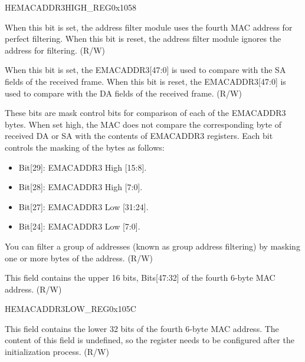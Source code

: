 \begin{register}{H}{EMACADDR3HIGH\_REG}{0x1058}\label{regdesc:EMACADDR3HIGHREG}
%
%
%
%
%
\regnewline%
\begin{regdesc}\begin{reglist}
\item [ADDRESS\_ENABLE3]When this bit is set, the address filter module uses the fourth MAC address  for perfect filtering. When this bit is reset, the address filter module ignores the address for filtering. (R/W)
\item [SOURCE\_ADDRESS3]When this bit is set, the EMACADDR3[47:0] is used to compare with the SA fields of the received frame. When this bit is reset, the EMACADDR3[47:0] is used to compare with the DA fields of the received frame. (R/W)
\item [MASK\_BYTE\_CONTROL3]These bits are mask control bits for comparison of each of the EMACADDR3 bytes. When set high, the MAC does not compare the corresponding byte of received DA or SA with the contents of EMACADDR3 registers. Each bit controls the masking of the bytes as follows: \begin{itemize}
\item Bit[29]: EMACADDR3 High [15:8]. \item Bit[28]: EMACADDR3 High [7:0]. \item Bit[27]: EMACADDR3 Low [31:24]. \item Bit[24]: EMACADDR3 Low [7:0].
\end{itemize} You can filter a group of addresses (known as group address filtering) by masking one or more bytes of the address. (R/W)
\item [MAC\_ADDRESS3\_HI]This field contains the upper 16 bits, Bits[47:32] of the fourth 6-byte MAC address. (R/W)
\end{reglist}\end{regdesc}
\end{register}


\begin{register}{H}{EMACADDR3LOW\_REG}{0x105C}\label{regdesc:EMACADDR3LOWREG}
%
\regnewline%
\begin{regdesc}\begin{reglist}
\item [EMACADDR3LOW\_REG]This field contains the lower 32 bits of the fourth 6-byte MAC address. The content of this field is undefined, so the register needs to be configured after the initialization process. (R/W)
\end{reglist}\end{regdesc}
\end{register}

